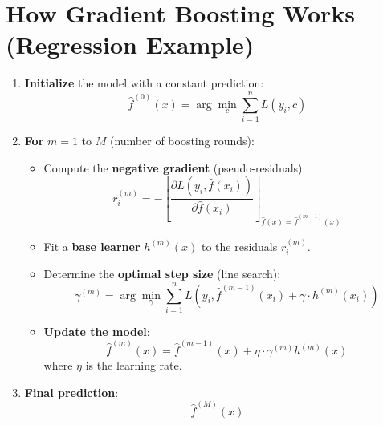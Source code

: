 \documentclass[
  letterpaper,
  DIV=11,
  numbers=noendperiod]{scrreprt}
\begin{document}
\section{How Gradient Boosting Works (Regression
Example)}\label{how-gradient-boosting-works-regression-example}

\begin{enumerate}
\def\labelenumi{\arabic{enumi}.}
\item
  \textbf{Initialize} the model with a constant prediction:\\
  \[
  \hat{f}^{(0)}(x) = \arg\min_c \sum_{i=1}^n L(y_i, c)
  \]
\item
  \textbf{For} \(m = 1\) to \(M\) (number of boosting rounds):

  \begin{itemize}
  \item
    Compute the \textbf{negative gradient} (pseudo-residuals):\\
    \[
    r_i^{(m)} = - \left[ \frac{\partial L(y_i, \hat{f}(x_i))}{\partial \hat{f}(x_i)} \right]_{\hat{f}(x) = \hat{f}^{(m-1)}(x)}
    \]
  \item
    Fit a \textbf{base learner} \(h^{(m)}(x)\) to the residuals
    \(r_i^{(m)}\).
  \item
    Determine the \textbf{optimal step size} (line search):\\
    \[
    \gamma^{(m)} = \arg\min_\gamma \sum_{i=1}^n L\left(y_i, \hat{f}^{(m-1)}(x_i) + \gamma \cdot h^{(m)}(x_i)\right)
    \]
  \item
    \textbf{Update the model}:\\
    \[
    \hat{f}^{(m)}(x) = \hat{f}^{(m-1)}(x) + \eta \cdot \gamma^{(m)} h^{(m)}(x)
    \] where \(\eta\) is the learning rate.
  \end{itemize}
\item
  \textbf{Final prediction}:\\
  \[
  \hat{f}^{(M)}(x)
  \]
\end{enumerate}
\end{document}
